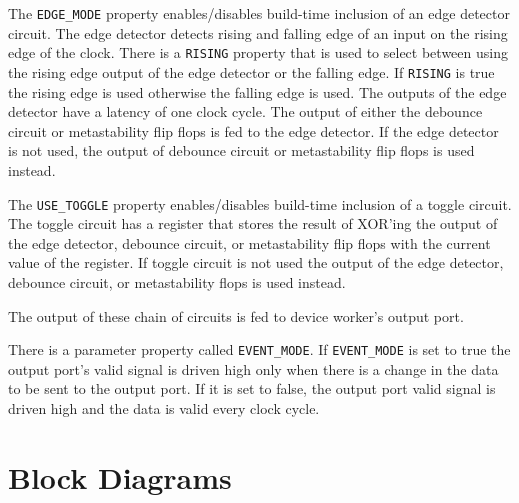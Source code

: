 \documentclass{article}
\begin{document}
\begin{flushleft}
The \texttt{EDGE\_MODE} property enables/disables build-time inclusion of an edge detector circuit. The edge detector detects rising and falling edge of an input
on the rising edge of the clock. There is a \texttt{RISING} property that is used to select between using the rising edge output of the edge detector or the falling edge. If \texttt{RISING} is true the rising edge is used otherwise the falling edge is used. The outputs of the edge detector have a latency of one clock cycle. The output of either the debounce circuit or metastability flip flops is fed to the edge detector. If the edge detector is not used, the output of debounce circuit or metastability flip flops is used instead. \newline

The \texttt{USE\_TOGGLE} property enables/disables build-time inclusion of a toggle circuit. The toggle circuit has a register that stores the result of XOR'ing the output of the edge detector, debounce circuit, or metastability flip flops with the current value of the register. If toggle circuit is not used the output of the edge detector, debounce circuit, or metastability flops is used instead.   \newline

The output of these chain of circuits is fed to device worker's output port. \newline

There is a parameter property called \texttt{EVENT\_MODE}. If \texttt{EVENT\_MODE} is set to true the output port's valid signal is driven high only when there is a change in the data to be sent to the output port. If it is set to false, the output port valid signal is driven high and the data is valid every clock cycle. 

\end{flushleft}


\section*{Block Diagrams}
\end{document}
